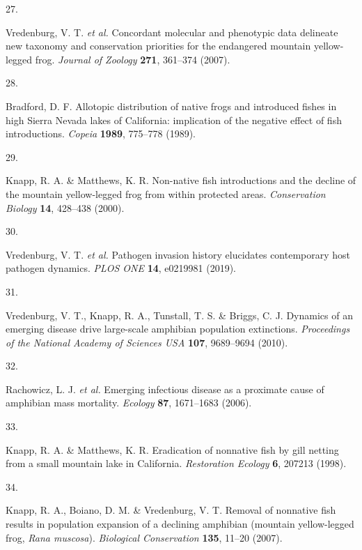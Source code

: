 \documentclass[
  letterpaper,
  DIV=11,
  numbers=noendperiod]{scrartcl}
\newlength{\cslhangindent}
\newlength{\csllabelwidth}
\newenvironment{CSLReferences}[2] %
 {\begin{list}{}{%
  \setlength{\itemindent}{0pt}
  \setlength{\leftmargin}{0pt}
  \setlength{\parsep}{0pt}
  \ifodd #1
   \setlength{\leftmargin}{\cslhangindent}
   \setlength{\itemindent}{-1\cslhangindent}
  \fi
  \setlength{\itemsep}{#2\baselineskip}}}
 {\end{list}}
\newcommand{\CSLLeftMargin}[1]{\parbox[t]{\csllabelwidth}{\strut#1\strut}}
\newcommand{\CSLRightInline}[1]{\parbox[t]{\linewidth - \csllabelwidth}{\strut#1\strut}}
\begin{document}
\begin{CSLReferences}{0}{0}
\CSLLeftMargin{27. }%
\CSLRightInline{Vredenburg, V. T. \emph{et al.} Concordant molecular and
phenotypic data delineate new taxonomy and conservation priorities for
the endangered mountain yellow-legged frog. \emph{Journal of Zoology}
\textbf{271}, 361--374 (2007).}

\CSLLeftMargin{28. }%
\CSLRightInline{Bradford, D. F. Allotopic distribution of native frogs
and introduced fishes in high {S}ierra {N}evada lakes of {C}alifornia:
{i}mplication of the negative effect of fish introductions.
\emph{Copeia} \textbf{1989}, 775--778 (1989).}

\CSLLeftMargin{29. }%
\CSLRightInline{Knapp, R. A. \& Matthews, K. R. Non-native fish
introductions and the decline of the mountain yellow-legged frog from
within protected areas. \emph{Conservation Biology} \textbf{14},
428--438 (2000).}

\CSLLeftMargin{30. }%
\CSLRightInline{Vredenburg, V. T. \emph{et al.} Pathogen invasion
history elucidates contemporary host pathogen dynamics. \emph{PLOS ONE}
\textbf{14}, e0219981 (2019).}

\CSLLeftMargin{31. }%
\CSLRightInline{Vredenburg, V. T., Knapp, R. A., Tunstall, T. S. \&
Briggs, C. J. Dynamics of an emerging disease drive large-scale
amphibian population extinctions. \emph{Proceedings of the National
Academy of Sciences USA} \textbf{107}, 9689--9694 (2010).}

\CSLLeftMargin{32. }%
\CSLRightInline{Rachowicz, L. J. \emph{et al.} Emerging infectious
disease as a proximate cause of amphibian mass mortality. \emph{Ecology}
\textbf{87}, 1671--1683 (2006).}

\CSLLeftMargin{33. }%
\CSLRightInline{Knapp, R. A. \& Matthews, K. R. Eradication of nonnative
fish by gill netting from a small mountain lake in {C}alifornia.
\emph{Restoration Ecology} \textbf{6}, 207213 (1998).}

\CSLLeftMargin{34. }%
\CSLRightInline{Knapp, R. A., Boiano, D. M. \& Vredenburg, V. T. Removal
of nonnative fish results in population expansion of a declining
amphibian (mountain yellow-legged frog, \emph{{R}ana muscosa}).
\emph{Biological Conservation} \textbf{135}, 11--20 (2007).}


\end{CSLReferences}
\end{document}
